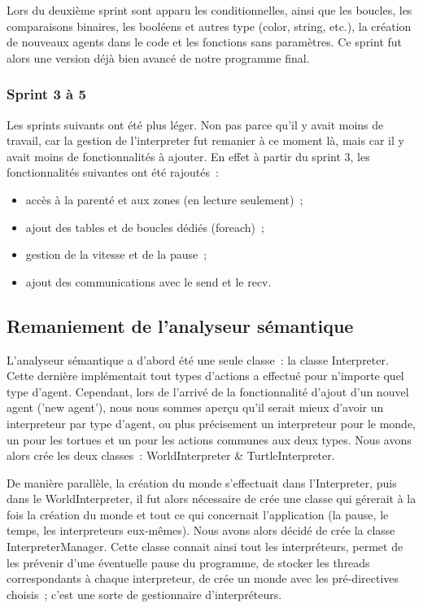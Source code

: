 Lors du deuxième sprint sont apparu les conditionnelles, ainsi que les boucles, les comparaisons binaires, les booléens et autres type (color, string, etc.), la création de nouveaux agents dans le code et les fonctions sans paramètres. Ce sprint fut alors une version déjà bien avancé de notre programme final.


\subsubsection{Sprint 3 à 5}
Les sprints suivants ont été plus léger. Non pas parce qu'il y avait moins de travail, car la gestion de l'interpreter fut remanier à ce moment là, mais car il y avait moins de fonctionnalités à ajouter. En effet à partir du sprint 3, les fonctionnalités suivantes ont été rajoutés~:
\begin{itemize}
\item accès à la parenté et aux zones (en lecture seulement)~;
\item ajout des tables et de boucles dédiés (foreach)~;
\item gestion de la vitesse et de la pause~;
\item ajout des communications avec le send et le recv.
\end{itemize}


\subsection{Remaniement de l'analyseur sémantique}
\label{remaniementInterpreter}

L'analyseur sémantique a d'abord été une seule classe~: la classe Interpreter.
Cette dernière implémentait tout types d'actions a effectué pour n'importe quel type d'agent.
Cependant, lors de l'arrivé de la fonctionnalité d'ajout d'un nouvel agent ('new agent'), nous nous sommes aperçu qu'il serait mieux d'avoir un interpreteur par type d'agent, ou plus précisement un interpreteur pour le monde, un pour les tortues et un pour les actions communes aux deux types.
Nous avons alors crée les deux classes~: WorldInterpreter \& TurtleInterpreter.

De manière parallèle, la création du monde s'effectuait dans l'Interpreter, puis dans le WorldInterpreter, il fut alors nécessaire de crée une classe qui gérerait à la fois la création du monde et tout ce qui concernait l'application (la pause, le temps, les interpreteurs eux-mêmes). Nous avons alors décidé de crée la classe InterpreterManager.
Cette classe connait ainsi tout les interpréteurs, permet de les prévenir d'une éventuelle pause du programme, de stocker les threads correspondants à chaque interpreteur, de crée un monde avec les pré-directives choisis~; c'est une sorte de gestionnaire d'interpréteurs.

